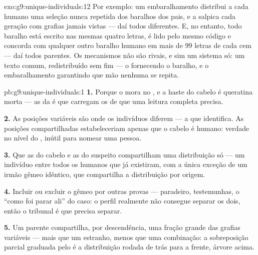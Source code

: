 \begin{solution}{exo:g9:unique-individuals:12}
Por exemplo: um embaralhamento distribui a cada humano uma
seleção nunca repetida dos baralhos dos pais, e a 
salpica cada geração com grafias jamais vistas --- daí todos
diferentes. E, no entanto, todo baralho está escrito nas
mesmas quatro letras, é lido pelo mesmo código e concorda com
qualquer outro baralho humano em mais de $99$ letras de cada
cem --- daí todos parentes. Os mecanismos não são rivais, e
sim um sistema só: um texto comum, redistribuído sem fim ---
o  fornecendo o baralho, e o embaralhamento
garantindo que mão nenhuma se repita.
\end{solution}

\begin{solution}{pb:g9:unique-individuals:1}
\textbf{1.} Porque o  mora no , e a haste do cabelo
é queratina morta --- as  da  é que carregam os
 de que uma leitura completa precisa.

\textbf{2.} As posições variáveis são onde os indivíduos
diferem --- a  que identifica. As posições
compartilhadas estabeleceriam apenas que o cabelo é humano:
verdade no nível do , inútil para nomear uma
pessoa.

\textbf{3.} Que as  do cabelo e as do suspeito
compartilham uma distribuição só --- um indivíduo entre todos
os humanos que já existiram, com a única exceção de um irmão
gêmeo idêntico, que compartilha a distribuição por origem.

\textbf{4.} Incluir ou excluir o gêmeo por outras provas ---
paradeiro, testemunhas, o ``como foi parar ali'' do caso: o
perfil realmente não consegue separar os dois, então o
tribunal é que precisa separar.

\textbf{5.} Um parente compartilha, por descendência, uma
fração grande das grafias variáveis --- mais que um estranho,
menos que uma combinação: a sobreposição parcial graduada
pelo  é a distribuição rodada de trás para a
frente, árvore acima.


\end{solution}
